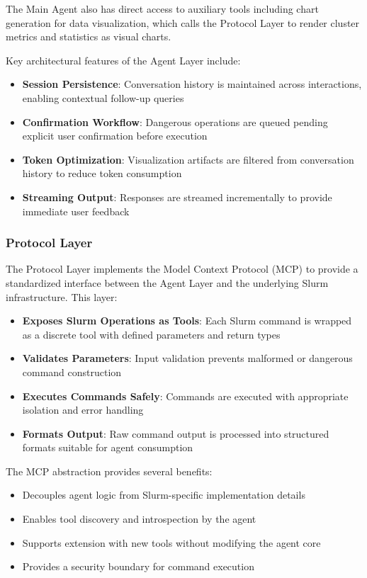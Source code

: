 The Main Agent also has direct access to auxiliary tools including chart generation for data visualization, which calls the Protocol Layer to render cluster metrics and statistics as visual charts.

Key architectural features of the Agent Layer include:
\begin{itemize}
    \item \textbf{Session Persistence}: Conversation history is maintained across interactions, enabling contextual follow-up queries
    \item \textbf{Confirmation Workflow}: Dangerous operations are queued pending explicit user confirmation before execution
    \item \textbf{Token Optimization}: Visualization artifacts are filtered from conversation history to reduce token consumption
    \item \textbf{Streaming Output}: Responses are streamed incrementally to provide immediate user feedback
\end{itemize}

\subsubsection{Protocol Layer}

The Protocol Layer implements the Model Context Protocol (MCP) to provide a standardized interface between the Agent Layer and the underlying Slurm infrastructure. This layer:

\begin{itemize}
    \item \textbf{Exposes Slurm Operations as Tools}: Each Slurm command is wrapped as a discrete tool with defined parameters and return types
    \item \textbf{Validates Parameters}: Input validation prevents malformed or dangerous command construction
    \item \textbf{Executes Commands Safely}: Commands are executed with appropriate isolation and error handling
    \item \textbf{Formats Output}: Raw command output is processed into structured formats suitable for agent consumption
\end{itemize}

The MCP abstraction provides several benefits:
\begin{itemize}
    \item Decouples agent logic from Slurm-specific implementation details
    \item Enables tool discovery and introspection by the agent
    \item Supports extension with new tools without modifying the agent core
    \item Provides a security boundary for command execution
\end{itemize}

